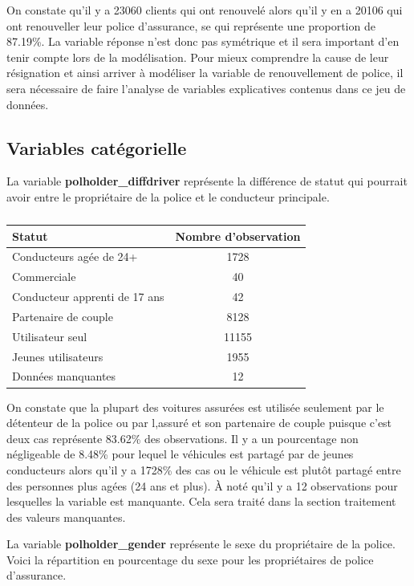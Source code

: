 \documentclass[
]{article}
\begin{document}
On constate qu'il y a 23060 clients qui ont renouvelé alors qu'il y en a
20106 qui ont renouveller leur police d'assurance, se qui représente une
proportion de 87.19\%. La variable réponse n'est donc pas symétrique et
il sera important d'en tenir compte lors de la modélisation. Pour mieux
comprendre la cause de leur résignation et ainsi arriver à modéliser la
variable de renouvellement de police, il sera nécessaire de faire
l'analyse de variables explicatives contenus dans ce jeu de données.

\hypertarget{variables-catuxe9gorielle}{%
\subsection{Variables catégorielle}\label{variables-catuxe9gorielle}}

La variable \textbf{polholder\_diffdriver} représente la différence de
statut qui pourrait avoir entre le propriétaire de la police et le
conducteur principale.

\begin{table}[ht]
\centering
\caption{} 
\label{}
\begin{tabular}{lc}
  \hline
Statut & Nombre d'observation \\ 
  \hline
Conducteurs agée de 24+ & 1728 \\ 
  Commerciale & 40 \\ 
  Conducteur apprenti de 17 ans & 42 \\ 
  Partenaire de couple & 8128 \\ 
  Utilisateur seul & 11155 \\ 
  Jeunes utilisateurs & 1955 \\ 
  Données manquantes & 12 \\ 
   \hline
\end{tabular}
\end{table}

On constate que la plupart des voitures assurées est utilisée seulement
par le détenteur de la police ou par l,assuré et son partenaire de
couple puisque c'est deux cas représente 83.62\% des observations. Il y
a un pourcentage non négligeable de 8.48\% pour lequel le véhicules est
partagé par de jeunes conducteurs alors qu'il y a 1728\% des cas ou le
véhicule est plutôt partagé entre des personnes plus agées (24 ans et
plus). À noté qu'il y a 12 observations pour lesquelles la variable est
manquante. Cela sera traité dans la section traitement des valeurs
manquantes.

La variable \textbf{polholder\_gender} représente le sexe du
propriétaire de la police. Voici la répartition en pourcentage du sexe
pour les propriétaires de police d'assurance.
\end{document}
